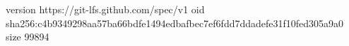 version https://git-lfs.github.com/spec/v1
oid sha256:c4b9349298aa57ba66bdfe1494edbafbec7ef6fdd7ddadefe31f10fed305a9a0
size 99894
